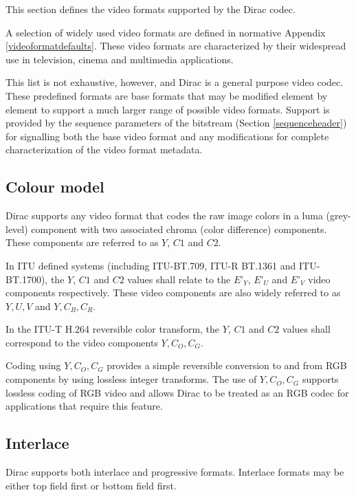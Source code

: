 This section defines the video formats supported by the Dirac codec.

A selection of widely used video formats are defined in normative Appendix 
\ref{videoformatdefaults}. These video formats are characterized by
their widespread use in television, cinema and multimedia applications.

This list is not exhaustive, however, and Dirac is a general purpose video 
codec. These predefined formats are base formats that may be modified element by
element to support a much larger range of possible video formats. Support
is provided by the sequence parameters of the bitstream (Section 
\ref{sequenceheader}) for signalling both the base video format and
any modifications for complete characterization of the video format metadata.


\subsection{Colour model}

Dirac supports any video format that codes the raw image colors in a luma 
(grey-level) component with two associated chroma (color difference) components.
 These components are referred to as $Y$, $C1$ and $C2$.

In ITU defined systems (including ITU-BT.709, ITU-R BT.1361 and ITU-BT.1700), 
the $Y$, $C1$ and $C2$ values shall relate to the $E’_Y$, $E’_U$ and $E’_V$ 
video components respectively. These video components are also widely referred 
to as $Y, U, V$ and $Y, C_B , C_R$.

In the ITU-T H.264 reversible color transform, the $Y$, $C1$ and $C2$ values 
shall correspond to the video components $Y, C_O, C_G$.

\begin{informative}
Coding using $Y, C_O, C_G$ provides a simple reversible conversion to and from
RGB components by using lossless integer transforms. The use of $Y, C_O, C_G$
supports lossless coding of RGB video and allows Dirac to be treated as an RGB
codec for applications that require this feature.
\end{informative}

\subsection{Interlace}

Dirac supports both interlace and progressive formats. Interlace formats may be
 either top field first or bottom field first.

